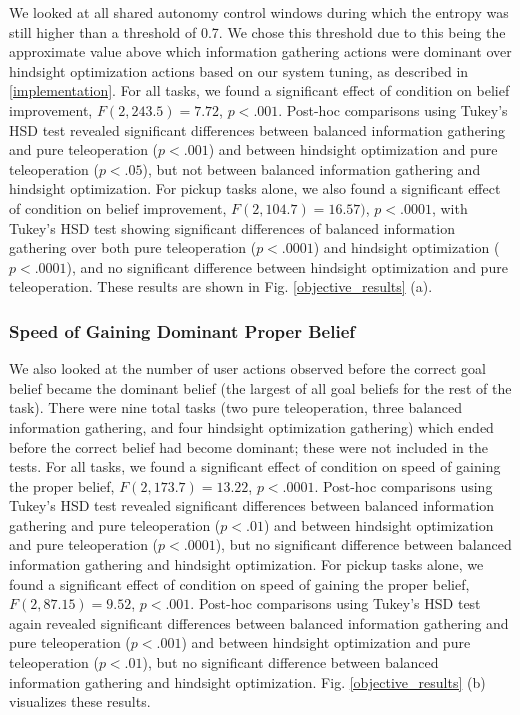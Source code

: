 \documentclass[conference]{IEEEtran}
\begin{document}
We looked at all shared autonomy control windows during which the entropy was still higher than a threshold of 0.7. We chose this threshold due to this being the approximate value above which information gathering actions were dominant over hindsight optimization actions based on our system tuning, as described in \ref{implementation}. For all tasks, we found a significant effect of condition on belief improvement, $F(2, 243.5) = 7.72$, $p < .001$. Post-hoc comparisons using Tukey's HSD test revealed significant differences between balanced information gathering and pure teleoperation ($p < .001$) and between hindsight optimization and pure teleoperation ($p < .05$), but not between balanced information gathering and hindsight optimization. For pickup tasks alone, we also found a significant effect of condition on belief improvement, $F(2, 104.7) = 16.57)$, $p < .0001$, with Tukey's HSD test showing significant differences of balanced information gathering over both pure teleoperation ($p < .0001$) and hindsight optimization ($p < .0001$), and no significant difference between hindsight optimization and pure teleoperation. These results are shown in Fig. \ref{objective_results} (a).

\subsubsection{Speed of Gaining Dominant Proper Belief}

We also looked at the number of user actions observed before the correct goal belief became the dominant belief (the largest of all goal beliefs for the rest of the task). There were nine total tasks (two pure teleoperation, three balanced information gathering, and four hindsight optimization gathering) which ended before the correct belief had become dominant; these were not included in the tests. For all tasks, we found a significant effect of condition on speed of gaining the proper belief, $F(2, 173.7) = 13.22$, $p < .0001$. Post-hoc comparisons using Tukey's HSD test revealed significant differences between balanced information gathering and pure teleoperation ($p < .01$) and between hindsight optimization and pure teleoperation ($p < .0001$), but no significant difference between balanced information gathering and hindsight optimization. For pickup tasks alone, we found a significant effect of condition on speed of gaining the proper belief, $F(2, 87.15) = 9.52$, $p < .001$. Post-hoc comparisons using Tukey's HSD test again revealed significant differences between balanced information gathering and pure teleoperation ($p < .001$) and between hindsight optimization and pure teleoperation ($p < .01$), but no significant difference between balanced information gathering and hindsight optimization. Fig. \ref{objective_results} (b) visualizes these results.
\end{document}
